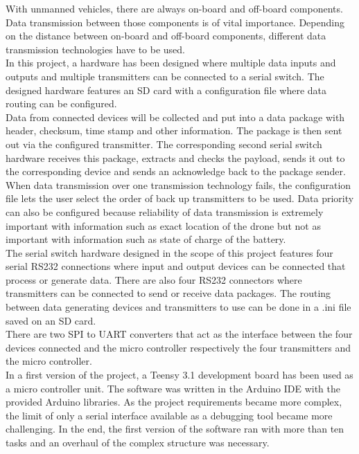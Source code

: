 %
With unmanned vehicles, there are always on-board and off-board components. Data transmission between those components is of vital importance. Depending on the distance between on-board and off-board components, different data transmission technologies have to be used. \\
In this project, a hardware has been designed where multiple data inputs and outputs and multiple transmitters can be connected to a serial switch. The designed hardware features an SD card with a configuration file where data routing can be configured. \\
Data from connected devices will be collected and put into a data package with header, checksum, time stamp and other information. The package is then sent out via the configured transmitter. The corresponding second serial switch hardware receives this package, extracts and checks the payload, sends it out to the corresponding device and sends an acknowledge back to the package sender. \\
When data transmission over one transmission technology fails, the configuration file lets the user select the order of back up transmitters to be used. Data priority can also be configured because reliability of data transmission is extremely important with information such as exact location of the drone but not as important with information such as state of charge of the battery. \\
The serial switch hardware designed in the scope of this project features four serial RS232 connections where input and output devices can be connected that process or generate data. There are also four RS232 connectors where transmitters can be connected to send or receive data packages. The routing between data generating devices and transmitters to use can be done in a .ini file saved on an SD card. \\
There are two SPI to UART converters that act as the interface between the four devices connected and the micro controller respectively the four transmitters and the micro controller. \\
In a first version of the project, a Teensy 3.1 development board has been used as a micro controller unit. The software was written in the Arduino IDE with the provided Arduino libraries. As the project requirements became more complex, the limit of only a serial interface available as a debugging tool became more challenging. In the end, the first version of the software ran with more than ten tasks and an overhaul of the complex structure was necessary.\\
